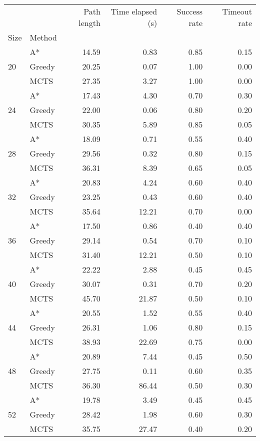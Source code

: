 \begin{tabular}{llrrrr}
\toprule
 &  & Path length & Time elapsed (s) & Success rate & Timeout rate \\
Size & Method &  &  &  &  \\
\midrule
\multirow[t]{3}{*}{20} & A* & 14.59 & 0.83 & 0.85 & 0.15 \\
 & Greedy & 20.25 & 0.07 & 1.00 & 0.00 \\
 & MCTS & 27.35 & 3.27 & 1.00 & 0.00 \\
\cline{1-6}
\multirow[t]{3}{*}{24} & A* & 17.43 & 4.30 & 0.70 & 0.30 \\
 & Greedy & 22.00 & 0.06 & 0.80 & 0.20 \\
 & MCTS & 30.35 & 5.89 & 0.85 & 0.05 \\
\cline{1-6}
\multirow[t]{3}{*}{28} & A* & 18.09 & 0.71 & 0.55 & 0.40 \\
 & Greedy & 29.56 & 0.32 & 0.80 & 0.15 \\
 & MCTS & 36.31 & 8.39 & 0.65 & 0.05 \\
\cline{1-6}
\multirow[t]{3}{*}{32} & A* & 20.83 & 4.24 & 0.60 & 0.40 \\
 & Greedy & 23.25 & 0.43 & 0.60 & 0.40 \\
 & MCTS & 35.64 & 12.21 & 0.70 & 0.00 \\
\cline{1-6}
\multirow[t]{3}{*}{36} & A* & 17.50 & 0.86 & 0.40 & 0.40 \\
 & Greedy & 29.14 & 0.54 & 0.70 & 0.10 \\
 & MCTS & 31.40 & 12.21 & 0.50 & 0.10 \\
\cline{1-6}
\multirow[t]{3}{*}{40} & A* & 22.22 & 2.88 & 0.45 & 0.45 \\
 & Greedy & 30.07 & 0.31 & 0.70 & 0.20 \\
 & MCTS & 45.70 & 21.87 & 0.50 & 0.10 \\
\cline{1-6}
\multirow[t]{3}{*}{44} & A* & 20.55 & 1.52 & 0.55 & 0.40 \\
 & Greedy & 26.31 & 1.06 & 0.80 & 0.15 \\
 & MCTS & 38.93 & 22.69 & 0.75 & 0.00 \\
\cline{1-6}
\multirow[t]{3}{*}{48} & A* & 20.89 & 7.44 & 0.45 & 0.50 \\
 & Greedy & 27.75 & 0.11 & 0.60 & 0.35 \\
 & MCTS & 36.30 & 86.44 & 0.50 & 0.30 \\
\cline{1-6}
\multirow[t]{3}{*}{52} & A* & 19.78 & 3.49 & 0.45 & 0.45 \\
 & Greedy & 28.42 & 1.98 & 0.60 & 0.30 \\
 & MCTS & 35.75 & 27.47 & 0.40 & 0.20 \\
\cline{1-6}
\bottomrule
\end{tabular}

